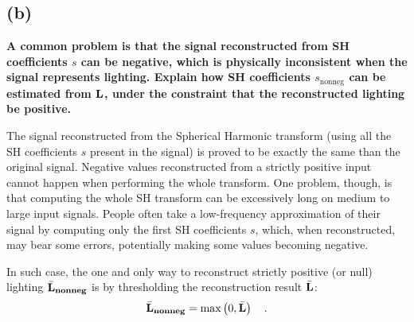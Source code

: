 \documentclass{report}
\begin{document}



\subsection{(b)}
\textbf{A common problem is that the signal reconstructed from SH coefficients $s$ can be negative, which is physically inconsistent when the signal represents lighting. Explain how SH coefficients $s_{\text{nonneg}}$ can be estimated from $\mathbf{L}$, under the constraint that the reconstructed lighting be positive.}


The signal reconstructed from the Spherical Harmonic transform (using all the SH coefficients $s$ present in the signal) is proved to be exactly the same than the original signal. Negative values reconstructed from a strictly positive input cannot happen when performing the whole transform. One problem, though, is that computing the whole SH transform can be excessively long on medium to large input signals. People often take a low-frequency approximation of their signal by computing only the first SH coefficients $s$, which, when reconstructed, may bear some errors, potentially making some values becoming negative.

In such case, the one and only way to reconstruct strictly positive (or null) lighting $\bar{\mathbf{L}}_{\mathbf{nonneg}}$ is by thresholding the reconstruction result $\bar{\mathbf{L}}$:
\begin{equation}
\bar{\mathbf{L}}_{\mathbf{nonneg}} = \max\left( 0, \bar{\mathbf{L}} \right) \quad.
\end{equation}
\end{document}
